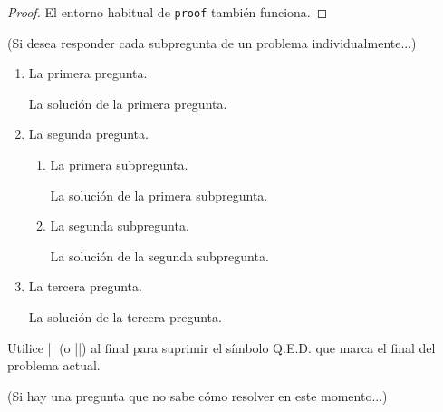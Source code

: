 \documentclass[11pt,
  logo = {example-image},
  title in boldface,
  theorem in new line,
  colored solution,
]{homework}
\begin{document}
\begin{proof}
    El entorno habitual de \verb|proof| también funciona.
\end{proof}


\bigskip\textcolor{gray!55}{(Si desea responder cada subpregunta de un problema individualmente...)}

\begin{problem}
    \begin{enumerate}
        \item La primera pregunta.

        \begin{solution}
            La solución de la primera pregunta.
        \end{solution}

        \item La segunda pregunta.

        \begin{enumerate}
            \item La primera subpregunta.

            \begin{solution}
                La solución de la primera subpregunta.
            \end{solution}

            \item La segunda subpregunta.

            \begin{solution}
                La solución de la segunda subpregunta.
            \end{solution}

        \end{enumerate}

        \item La tercera pregunta.

        \begin{solution}
            La solución de la tercera pregunta.
        \end{solution}

    \end{enumerate}
    Utilice \cverb|\noqed| (o \cverb|\noQED|) al final para suprimir el símbolo Q.E.D. que marca el final del problema actual.
    \noQED
\end{problem}


\bigskip\textcolor{gray!55}{(Si hay una pregunta que no sabe cómo resolver en este momento...)}

\end{document}
